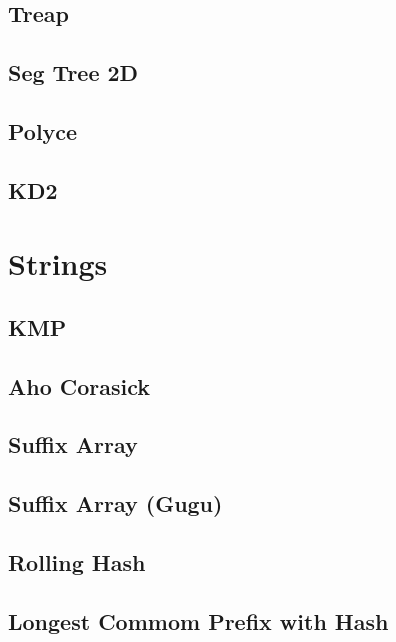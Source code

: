 \subsection{Treap}
\raggedbottom
\hrulefill
\subsection{Seg Tree 2D}
\raggedbottom
\hrulefill
\subsection{Polyce}
\raggedbottom
\hrulefill
\subsection{KD2}
\raggedbottom
\hrulefill

\section{Strings}
\subsection{KMP}
\raggedbottom
\hrulefill
\subsection{Aho Corasick}
\raggedbottom
\hrulefill
\subsection{Suffix Array}
\raggedbottom
\hrulefill
\subsection{Suffix Array (Gugu)}
\raggedbottom
\hrulefill
\subsection{Rolling Hash}
\raggedbottom
\hrulefill
\subsection{Longest Commom Prefix with Hash}
\raggedbottom
\hrulefill
